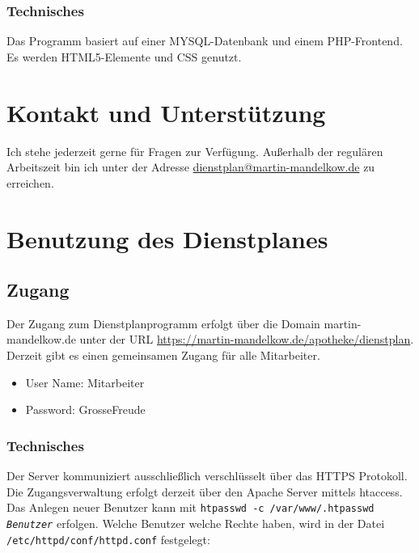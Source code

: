 \documentclass[10pt,a4paper,titlepage,oneside]{article}
\begin{document}
\subsubsection{Technisches}
Das Programm basiert auf einer MYSQL-Datenbank und einem PHP-Frontend.
Es werden HTML5-Elemente und CSS genutzt.










\section{Kontakt und Unterstützung}
Ich stehe jederzeit gerne für Fragen zur Verfügung.
Außerhalb der regulären Arbeitszeit bin ich unter der Adresse \href{mailto:dienstplan@martin-mandelkow.de}{dienstplan@martin-mandelkow.de} zu erreichen.










\section{Benutzung des Dienstplanes}
\subsection{Zugang}
Der Zugang zum Dienstplanprogramm erfolgt über die Domain martin-mandelkow.de unter der URL \url{https://martin-mandelkow.de/apotheke/dienstplan}.
Derzeit gibt es einen gemeinsamen Zugang für alle Mitarbeiter.
\begin{itemize}
	\item User Name: Mitarbeiter
	\item Password: GrosseFreude
\end{itemize}



\subsubsection{Technisches}
\begin{sloppypar}Der Server kommuniziert ausschließlich verschlüsselt über das HTTPS Protokoll.
Die Zugangsverwaltung erfolgt derzeit über den Apache Server mittels htaccess.
Das Anlegen neuer Benutzer kann mit \mbox{\texttt{htpasswd -c /var/www/.htpasswd \emph{Benutzer}}}
erfolgen. Welche Benutzer welche Rechte haben, wird in der Datei \mbox{\texttt{/etc/httpd/conf/httpd.conf}} festgelegt:
\end{sloppypar}
\end{document}
